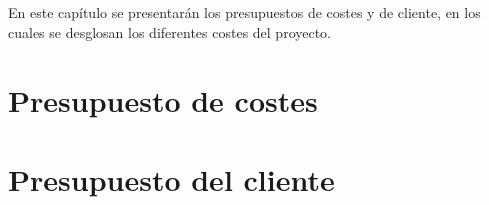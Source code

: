 En este capítulo se presentarán los presupuestos de costes y de cliente, en los cuales se desglosan los diferentes costes del proyecto.

\section{Presupuesto de costes}
\label{presupuesto:costes}


\section{Presupuesto del cliente}
\label{presupuesto:cliente}
